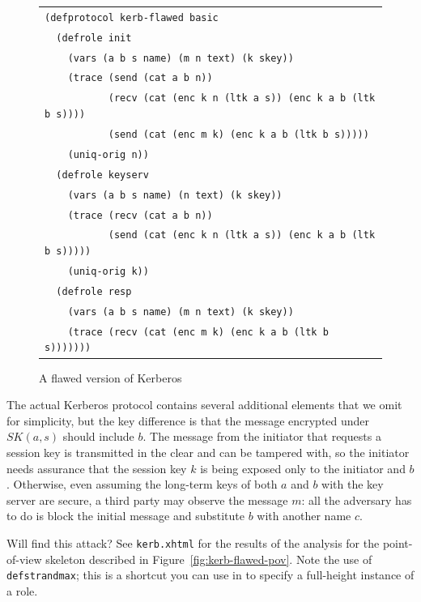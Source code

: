 \begin{figure}
\centering
\begin{tabular}{l}
\verb|(defprotocol kerb-flawed basic|\\
\verb|  (defrole init|\\
\verb|    (vars (a b s name) (m n text) (k skey))|\\
\verb|    (trace (send (cat a b n))|\\
\verb|           (recv (cat (enc k n (ltk a s)) (enc k a b (ltk b s))))|\\
\verb|           (send (cat (enc m k) (enc k a b (ltk b s)))))|\\
\verb|    (uniq-orig n))|\\
\verb|  (defrole keyserv|\\
\verb|    (vars (a b s name) (n text) (k skey))|\\
\verb|    (trace (recv (cat a b n))|\\
\verb|           (send (cat (enc k n (ltk a s)) (enc k a b (ltk b s)))))|\\
\verb|    (uniq-orig k))|\\
\verb|  (defrole resp|\\
\verb|    (vars (a b s name) (m n text) (k skey))|\\
\verb|    (trace (recv (cat (enc m k) (enc k a b (ltk b s)))))))|\\
\end{tabular}
\caption{A flawed version of Kerberos}
\label{fig:kerb-flawed defprotocol}
\end{figure}

The actual Kerberos protocol contains several additional elements that
we omit for simplicity, but the key difference is that the message
encrypted under $SK(a,s)$ should include $b$.  The message from the
initiator that requests a session key is transmitted in the clear and
can be tampered with, so the initiator needs assurance that the
session key $k$ is being exposed only to the initiator and $b$.
Otherwise, even assuming the long-term keys of both $a$ and $b$ with
the key server are secure, a third party may observe the message $m$:
all the adversary has to do is block the initial message and substitute
$b$ with another name $c$.

Will {\cpsa} find this attack?  See \texttt{kerb.xhtml} for the
results of the analysis for the point-of-view skeleton described in
Figure~\ref{fig:kerb-flawed-pov}.  Note the use of
\texttt{defstrandmax}; this is a shortcut you
can use in {\cpsa} to specify a full-height instance of a role.

